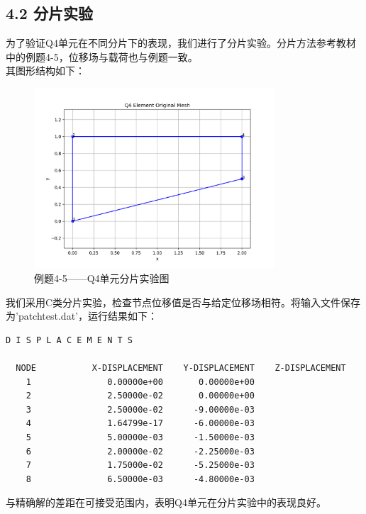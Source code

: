 \documentclass[12pt]{article}
\begin{document}
\subsection*{4.2 分片实验}
为了验证Q4单元在不同分片下的表现，我们进行了分片实验。分片方法参考教材中的例题4-5，位移场与载荷也与例题一致。\\
其图形结构如下：
\begin{figure}[htbp]
    \centering
    \includegraphics[width=0.8\textwidth]{data/Q4test_original.png}
    \caption{例题4-5——Q4单元分片实验图}
\end{figure}
我们采用C类分片实验，检查节点位移值是否与给定位移场相符。将输入文件保存为'patchtest.dat'，运行结果如下：
\begin{lstlisting}
D I S P L A C E M E N T S

  NODE           X-DISPLACEMENT    Y-DISPLACEMENT    Z-DISPLACEMENT
    1               0.00000e+00       0.00000e+00
    2               2.50000e-02       0.00000e+00
    3               2.50000e-02      -9.00000e-03
    4               1.64799e-17      -6.00000e-03
    5               5.00000e-03      -1.50000e-03
    6               2.00000e-02      -2.25000e-03
    7               1.75000e-02      -5.25000e-03
    8               6.50000e-03      -4.80000e-03
\end{lstlisting}
与精确解的差距在可接受范围内，表明Q4单元在分片实验中的表现良好。\\
\end{document}
